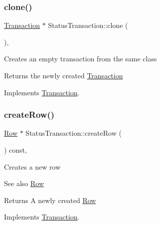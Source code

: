 \subsubsection{\texorpdfstring{clone()}{clone()}}
{\footnotesize\ttfamily \mbox{\hyperlink{classTransaction}{Transaction}} $\ast$ Status\+Transaction\+::clone (\begin{DoxyParamCaption}{ }\end{DoxyParamCaption})\hspace{0.3cm}{\ttfamily [override]}, {\ttfamily [virtual]}}

Creates an empty transaction from the same class

\begin{DoxyReturn}{Returns}
the newly created \mbox{\hyperlink{classTransaction}{Transaction}} 
\end{DoxyReturn}


Implements \mbox{\hyperlink{classTransaction_ad6ee9c5e4067b2f5c950c6aad131b3e4}{Transaction}}.

\mbox{\label{classStatusTransaction_adbd4d2730ccd884e64f9a6bd30487a3c}} 
\subsubsection{\texorpdfstring{create\+Row()}{createRow()}}
{\footnotesize\ttfamily \mbox{\hyperlink{classRow}{Row}} $\ast$ Status\+Transaction\+::create\+Row (\begin{DoxyParamCaption}{ }\end{DoxyParamCaption}) const\hspace{0.3cm}{\ttfamily [override]}, {\ttfamily [virtual]}}

Creates a new row \begin{DoxySeeAlso}{See also}
\mbox{\hyperlink{classRow}{Row}}
\end{DoxySeeAlso}
\begin{DoxyReturn}{Returns}
A newly created \mbox{\hyperlink{classRow}{Row}} 
\end{DoxyReturn}


Implements \mbox{\hyperlink{classTransaction_aa80b621537fe480dcb4444bba703abe5}{Transaction}}.

\mbox{\label{classStatusTransaction_a1f6c6fd3f04ba1483028aee23bd862da}} 
